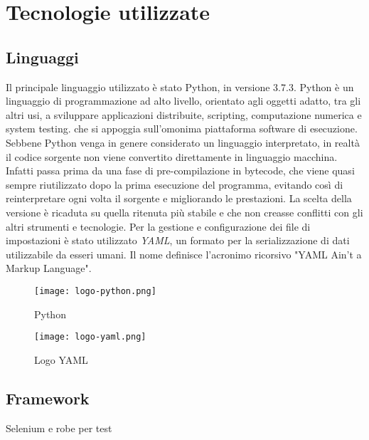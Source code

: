 \section{Tecnologie utilizzate}

\subsection{Linguaggi}
Il principale linguaggio utilizzato è stato Python, in versione 3.7.3. Python è un linguaggio di programmazione ad alto livello, orientato agli oggetti adatto, tra gli altri usi, a sviluppare applicazioni distribuite, scripting, computazione numerica e system testing.  che si appoggia sull’omonima piattaforma software di esecuzione. Sebbene Python venga in genere considerato un linguaggio interpretato, in realtà il codice sorgente non viene convertito direttamente in linguaggio macchina. Infatti passa prima da una fase di pre-compilazione in bytecode, che viene quasi sempre riutilizzato dopo la prima esecuzione del programma, evitando così di reinterpretare ogni volta il sorgente e migliorando le prestazioni. La scelta della versione è ricaduta su quella ritenuta più stabile e che non creasse conflitti con gli altri strumenti e tecnologie.\newline{}
Per la gestione e configurazione dei file di impostazioni è stato utilizzato \textit{YAML}, un formato per la serializzazione di dati utilizzabile da esseri umani. Il nome definisce l'acronimo ricorsivo "YAML Ain't a Markup Language".

\begin{figure}[!h]
    \begin{minipage}{.5\textwidth} 
        \centering 
        \texttt{[image: logo-python.png]} 
        \caption{Python} 
        \label{fig:python} 
    \end{minipage}%
    \begin{minipage}{.5\textwidth} 
        \centering 
        \texttt{[image: logo-yaml.png]} 
        \caption{Logo YAML} 
        \label{fig:yaml} 
    \end{minipage}%
\end{figure}


\subsection{Framework}
Selenium e robe per test 

